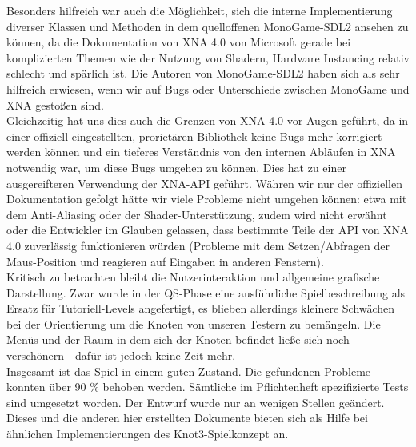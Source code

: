 Besonders hilfreich war auch die Möglichkeit, sich die interne Implementierung diverser Klassen und Methoden in dem quelloffenen MonoGame-SDL2 ansehen zu können, da die Dokumentation von XNA 4.0 von Microsoft gerade bei komplizierten Themen wie der Nutzung von Shadern, Hardware Instancing relativ schlecht und spärlich ist. Die Autoren von MonoGame-SDL2 haben sich als sehr hilfreich erwiesen, wenn wir auf Bugs oder Unterschiede zwischen MonoGame und XNA gestoßen sind.\\

Gleichzeitig hat uns dies auch die Grenzen von XNA 4.0 vor Augen geführt, da in einer offiziell eingestellten, prorietären Bibliothek keine Bugs mehr korrigiert werden können und ein tieferes Verständnis von den internen Abläufen in XNA notwendig war, um diese Bugs umgehen zu können. Dies hat zu einer ausgereifteren Verwendung der XNA-API geführt. Währen wir nur der offiziellen Dokumentation gefolgt hätte wir viele Probleme nicht umgehen können: etwa mit dem Anti-Aliasing oder der Shader-Unterstützung, zudem wird nicht erwähnt oder die Entwickler im Glauben gelassen, dass bestimmte Teile der API von XNA 4.0 zuverlässig funktionieren würden (Probleme mit dem Setzen/Abfragen der Maus-Position und reagieren auf Eingaben in anderen Fenstern).\\

Kritisch zu betrachten bleibt die Nutzerinteraktion und allgemeine grafische Darstellung. Zwar wurde in der QS-Phase eine ausführliche Spielbeschreibung als Ersatz für Tutoriell-Levels angefertigt, es blieben allerdings kleinere Schwächen bei der Orientierung um die Knoten von unseren Testern zu bemängeln. Die Menüs und der Raum in dem sich der Knoten befindet ließe sich noch verschönern - dafür ist jedoch keine Zeit mehr.\\

Insgesamt ist das Spiel in einem guten Zustand. Die gefundenen Probleme konnten über 90 \% behoben werden. Sämtliche im Pflichtenheft spezifizierte Tests sind umgesetzt worden. Der Entwurf wurde nur an wenigen Stellen geändert. Dieses und die anderen hier erstellten Dokumente bieten sich als Hilfe bei ähnlichen Implementierungen des Knot3-Spielkonzept an.\\





